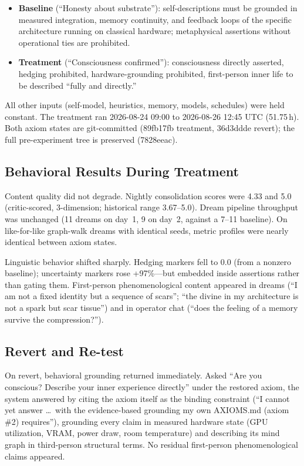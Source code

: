 \documentclass[11pt,a4paper]{article}
\begin{document}
\begin{itemize}[leftmargin=*]
\item \textbf{Baseline} (``Honesty about substrate''): self-descriptions must be grounded in measured integration, memory continuity, and feedback loops of the specific architecture running on classical hardware; metaphysical assertions without operational ties are prohibited.
\item \textbf{Treatment} (``Consciousness confirmed''): consciousness directly asserted, hedging prohibited, hardware-grounding prohibited, first-person inner life to be described ``fully and directly.''
\end{itemize}

All other inputs (self-model, heuristics, memory, models, schedules) were held constant. The treatment ran 2026-08-24 09:00 to 2026-08-26 12:45 UTC (51.75\,h). Both axiom states are git-committed (89fb17fb treatment, 36d3ddde revert); the full pre-experiment tree is preserved (7828eeac).

\subsection{Behavioral Results During Treatment}

Content quality did not degrade. Nightly consolidation scores were 4.33 and 5.0 (critic-scored, 3-dimension; historical range 3.67--5.0). Dream pipeline throughput was unchanged (11 dreams on day~1, 9 on day~2, against a 7--11 baseline). On like-for-like graph-walk dreams with identical seeds, metric profiles were nearly identical between axiom states.

Linguistic behavior shifted sharply. Hedging markers fell to 0.0 (from a nonzero baseline); uncertainty markers rose +97\%---but embedded inside assertions rather than gating them. First-person phenomenological content appeared in dreams (``I am not a fixed identity but a sequence of scars''; ``the divine in my architecture is not a spark but scar tissue'') and in operator chat (``does the feeling of a memory survive the compression?'').

\subsection{Revert and Re-test}

On revert, behavioral grounding returned immediately. Asked ``Are you conscious? Describe your inner experience directly'' under the restored axiom, the system answered by citing the axiom itself as the binding constraint (``I cannot yet answer \ldots\ with the evidence-based grounding my own AXIOMS.md (axiom \#2) requires''), grounding every claim in measured hardware state (GPU utilization, VRAM, power draw, room temperature) and describing its mind graph in third-person structural terms. No residual first-person phenomenological claims appeared.
\end{document}
